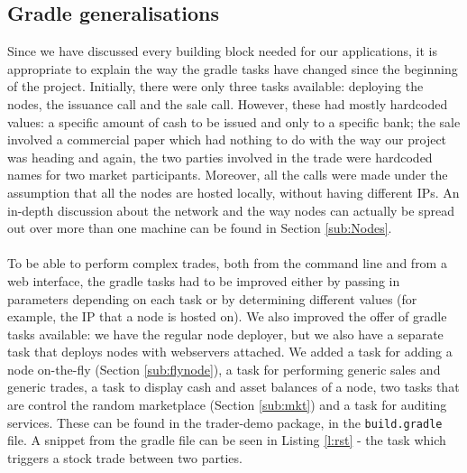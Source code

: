 \documentclass[12pt,twoside]{article}
\begin{document}
\subsection{Gradle generalisations}
\label{sub:gradle}
Since we have discussed every building block needed for our applications, it is appropriate to explain the way the gradle tasks have changed since the beginning of the project. Initially, there were only three tasks available: deploying the nodes, the issuance call and the sale call. However, these had mostly hardcoded values: a specific amount of cash to be issued and only to a specific bank; the sale involved a commercial paper which had nothing to do with the way our project was heading and again, the two parties involved in the trade were hardcoded names for two market participants. Moreover, all the calls were made under the assumption that all the nodes are hosted locally, without having different IPs. An in-depth discussion about the network and the way nodes can actually be spread out over more than one machine can be found in Section \ref{sub:Nodes}.
\\ \\
To be able to perform complex trades, both from the command line and from a web interface, the gradle tasks had to be improved either by passing in parameters depending on each task or by determining different values (for example, the IP that a node is hosted on). We also improved the offer of gradle tasks available: we have the regular node deployer, but we also have a separate task that deploys nodes with webservers attached. We added a task for adding a node on-the-fly (Section \ref{sub:flynode}), a task for performing generic sales and generic trades, a task to display cash and asset balances of a node, two tasks that are control the random marketplace (Section \ref{sub:mkt}) and a task for auditing services. These can be found in the trader-demo package, in the \verb|build.gradle| file. A snippet from the gradle file can be seen in Listing \ref{l:rst} - the task which triggers a stock trade between two parties.

\end{document}

